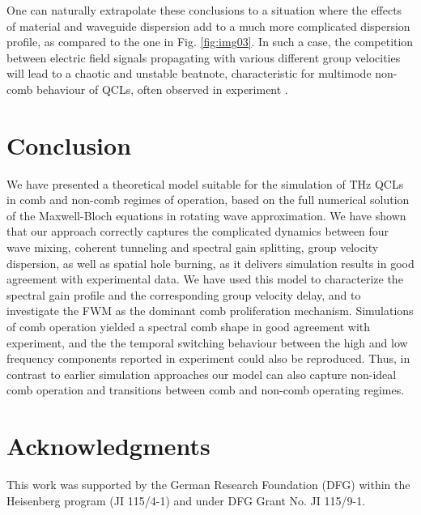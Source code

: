 \documentclass[10pt,letterpaper]{article}%
\begin{document}
One can naturally extrapolate these conclusions to a situation where the
effects of material and waveguide dispersion add to a much more complicated
dispersion profile, as compared to the one in Fig. \ref{fig:img03}. In such a
case, the competition between electric field signals propagating with various
different group velocities will lead to a chaotic and unstable beatnote,
characteristic for multimode non-comb behaviour of QCLs, often observed in
experiment \cite{wienold2014evidence,burghoff2014terahertz,rosch2015octave}.

\section{Conclusion}

We have presented a theoretical model suitable for the simulation of THz QCLs
in comb and non-comb regimes of operation, based on the full numerical
solution of the Maxwell-Bloch equations in rotating wave approximation. We
have shown that our approach correctly captures the complicated dynamics
between four wave mixing, coherent tunneling and spectral gain splitting,
group velocity dispersion, as well as spatial hole burning, as it delivers
simulation results in good agreement with experimental data. We have used this
model to characterize the spectral gain profile and the corresponding group
velocity delay, and to investigate the FWM as the dominant comb proliferation
mechanism. Simulations of comb operation yielded a spectral comb shape in good
agreement with experiment, and the the temporal switching behaviour between
the high and low frequency components reported in experiment could also be
reproduced. Thus, in contrast to earlier simulation approaches our model can
also capture non-ideal comb operation and transitions between comb and
non-comb operating regimes.%


\section*{Acknowledgments}
This work was supported by the German Research Foundation (DFG) within the
Heisenberg program (JI 115/4-1) and under DFG Grant No. JI 115/9-1.
\end{document}
